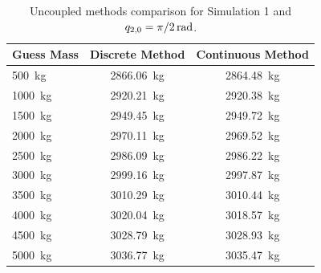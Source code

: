 \documentclass[a4paper,12pt,oneside]{report}
\begin{document}
\begin{table}[b]
  \caption{Uncoupled methods comparison for Simulation 1 and $q_{2,0}=\SI[parse-numbers = false]{\pi/2}{\radian}$.}
  \label{uncoupled_comparison_1}
  \begin{center}
  \begin{tabular}{lcc}
    \toprule
    \textbf{Guess Mass}&\textbf{Discrete Method}&\textbf{Continuous Method}\\
  \midrule
  \SI{500}{\kilogram}&\SI{2866.06}{\kilogram}&\SI{2864.48}{\kilogram}\\
  \SI{1000}{\kilogram}&\SI{2920.21}{\kilogram}&\SI{2920.38}{\kilogram}\\
  \SI{1500}{\kilogram}&\SI{2949.45}{\kilogram}&\SI{2949.72}{\kilogram}\\
  \SI{2000}{\kilogram}&\SI{2970.11}{\kilogram}&\SI{2969.52}{\kilogram}\\
  \SI{2500}{\kilogram}&\SI{2986.09}{\kilogram}&\SI{2986.22}{\kilogram}\\
  \SI{3000}{\kilogram}&\SI{2999.16}{\kilogram}&\SI{2997.87}{\kilogram}\\
  \SI{3500}{\kilogram}&\SI{3010.29}{\kilogram}&\SI{3010.44}{\kilogram}\\
  \SI{4000}{\kilogram}&\SI{3020.04}{\kilogram}&\SI{3018.57}{\kilogram}\\
  \SI{4500}{\kilogram}&\SI{3028.79}{\kilogram}&\SI{3028.93}{\kilogram}\\
  \SI{5000}{\kilogram}&\SI{3036.77}{\kilogram}&\SI{3035.47}{\kilogram}\\
  \bottomrule
  \end{tabular}
  \end{center}
\end{table}
\end{document}
